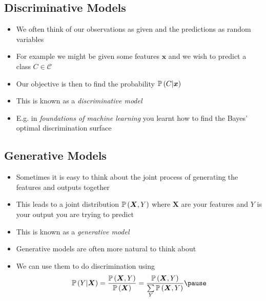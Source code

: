 
\begin{slide}
\section{Discriminative Models}

\begin{PauseHighLight}
  \begin{itemize}
  \item We often think of our observations as given and the predictions
    as random variables\pause
  \item For example we might be given some features $\bm{x}$ and we wish
    to predict a class $C\in\mathcal{C}$\pause
  \item Our objective is then to find the probability $\mathbb{P}\left( C|\bm{x} \right)$\pause
  \item This is known as a \emph{discriminative model}\pause
  \item E.g.{} in \textit{foundations of machine learning} you learnt how to
    find the Bayes' optimal discrimination surface\pause
  \end{itemize}
\end{PauseHighLight}

\end{slide}



\begin{slide}
\section{Generative Models}

\begin{PauseHighLight}
  \begin{itemize}
  \item Sometimes it is easy to think about the joint process of
    generating the features and outputs together\pause
  \item This leads to a joint distribution $\mathbb{P}\left( \bm{X},Y \right)$ where
    $\bm{X}$ are your features and $Y$ is your output you are trying to
    predict\pause
  \item This is known as a \emph{generative model}\pause
  \item Generative models are often more natural to think about\pause
  \item We can use them to do discrimination using
    \begin{align*}
      \Prob{Y|\bm{X}} = \frac{\Prob{\bm{X},Y}}{\Prob{\bm{X}}}
      = \frac{\Prob{\bm{X},Y}}{\sum\limits_Y \Prob{\bm{X}, Y}}\pause
    \end{align*}
  \end{itemize}
\end{PauseHighLight}

\end{slide}

